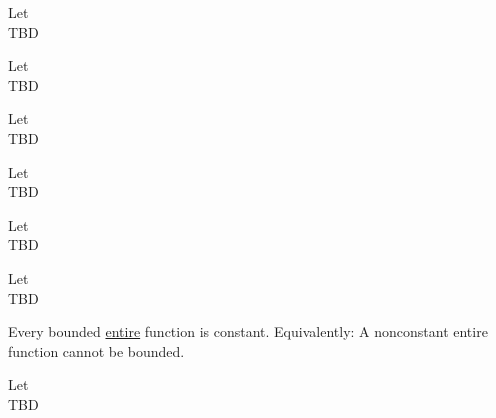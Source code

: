 \begin{theorem}
    \label{sec:BranchLog}
    Let \\
    TBD
\end{theorem}


\begin{theorem}[Lemma (II.3.1)]
    \label{sec:LemmaII31}
    Let \\
    TBD
\end{theorem}


\begin{theorem}
    \label{sec:CauchyIF}
    Let \\
    TBD
\end{theorem}


\begin{theorem}
    \label{sec:LeibnizRule}
    Let \\
    TBD
\end{theorem}


\begin{theorem}
    \label{sec:GCauchyIF}
    Let \\
    TBD
\end{theorem}


\begin{theorem}
    \label{sec:MoreraT}
    Let \\
    TBD
\end{theorem}


\begin{theorem}
    \label{sec:LiouvilleT}
    Every bounded \hyperref[sec:EntireFunction]{entire} function is constant. Equivalently: A nonconstant entire
    function cannot be bounded.
\end{theorem}


\begin{theorem}
    \label{sec:FTAlgebra}
    Let \\
    TBD
\end{theorem}